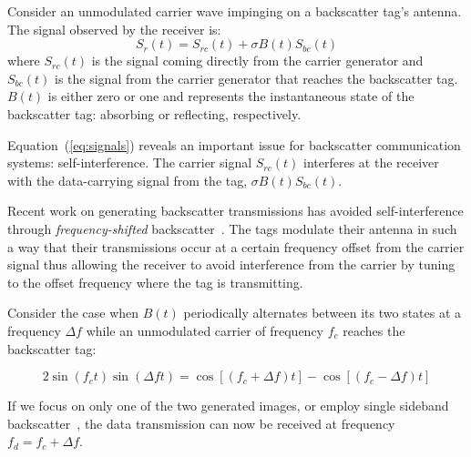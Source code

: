 Consider an unmodulated carrier wave impinging on a backscatter tag's
antenna. The signal observed by the receiver is:
\begin{equation}
				S_r(t) = S_{rc}(t) + \sigma B(t)S_{bc}(t)
				\label{eq:signals}
\end{equation}
where $S_{rc}(t)$ is the signal coming directly from the carrier
generator and $S_{bc}(t)$ is the signal from the carrier generator that
reaches the backscatter tag. $B(t)$ is either zero or one and represents
the instantaneous state of the backscatter tag: absorbing or reflecting,
respectively.

Equation~(\ref{eq:signals}) reveals an important issue for backscatter
communication systems: self-interference. The carrier signal $S_{rc}(t)$
interferes at the receiver with the data-carrying signal from the tag,
$\sigma B(t)S_{bc}(t)$. 

Recent work on generating backscatter transmissions has avoided
self-interference through \textit{frequency-shifted}
backscatter~\cite{kellogg_passive_2016,wang_fm_2017,varshney2016lorea}.
The tags modulate their antenna in such a way that their transmissions
occur at a certain frequency offset from the carrier signal thus
allowing the receiver to avoid interference from the carrier by tuning
to the offset frequency where the tag is transmitting.

Consider the case when $B(t)$ periodically
alternates between its two states at a frequency $\Delta f$ while an
unmodulated carrier of frequency $f_c$ reaches the backscatter tag:

\begin{equation}
    2\sin(f_c t) \sin(\Delta f t) = \cos[(f_c + \Delta f)t] - \cos[(f_c - \Delta f) t]
    \label{eq:mixing}
\end{equation}

If we focus on only one of the two generated images, or employ single
sideband backscatter~\cite{iyer2016inter}, the data transmission can now
be received at frequency $f_d = f_c + \Delta f$.

